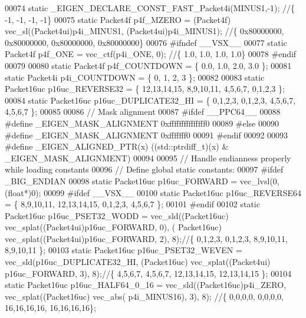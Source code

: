 \begin{DoxyCode}
00074 \textcolor{keyword}{static} \_EIGEN\_DECLARE\_CONST\_FAST\_Packet4i(MINUS1,-1); \textcolor{comment}{//\{ -1, -1, -1, -1\}}
00075 \textcolor{keyword}{static} Packet4f p4f\_MZERO = (Packet4f) vec\_sl((Packet4ui)p4i\_MINUS1, (Packet4ui)p4i\_MINUS1); \textcolor{comment}{//\{
       0x80000000, 0x80000000, 0x80000000, 0x80000000\}}
00076 \textcolor{preprocessor}{#ifndef \_\_VSX\_\_}
00077 \textcolor{keyword}{static} Packet4f p4f\_ONE = vec\_ctf(p4i\_ONE, 0); \textcolor{comment}{//\{ 1.0, 1.0, 1.0, 1.0\}}
00078 \textcolor{preprocessor}{#endif}
00079 
00080 \textcolor{keyword}{static} Packet4f p4f\_COUNTDOWN = \{ 0.0, 1.0, 2.0, 3.0 \};
00081 \textcolor{keyword}{static} Packet4i p4i\_COUNTDOWN = \{ 0, 1, 2, 3 \};
00082 
00083 \textcolor{keyword}{static} Packet16uc p16uc\_REVERSE32 = \{ 12,13,14,15, 8,9,10,11, 4,5,6,7, 0,1,2,3 \};
00084 \textcolor{keyword}{static} Packet16uc p16uc\_DUPLICATE32\_HI = \{ 0,1,2,3, 0,1,2,3, 4,5,6,7, 4,5,6,7 \};
00085 
00086 \textcolor{comment}{// Mask alignment}
00087 \textcolor{preprocessor}{#ifdef \_\_PPC64\_\_}
00088 \textcolor{preprocessor}{#define \_EIGEN\_MASK\_ALIGNMENT   0xfffffffffffffff0}
00089 \textcolor{preprocessor}{#else}
00090 \textcolor{preprocessor}{#define \_EIGEN\_MASK\_ALIGNMENT   0xfffffff0}
00091 \textcolor{preprocessor}{#endif}
00092 
00093 \textcolor{preprocessor}{#define \_EIGEN\_ALIGNED\_PTR(x)   ((std::ptrdiff\_t)(x) & \_EIGEN\_MASK\_ALIGNMENT)}
00094 
00095 \textcolor{comment}{// Handle endianness properly while loading constants}
00096 \textcolor{comment}{// Define global static constants:}
00097 \textcolor{preprocessor}{#ifdef \_BIG\_ENDIAN}
00098 \textcolor{keyword}{static} Packet16uc p16uc\_FORWARD = vec\_lvsl(0, (\textcolor{keywordtype}{float}*)0);
00099 \textcolor{preprocessor}{#ifdef \_\_VSX\_\_}
00100 \textcolor{keyword}{static} Packet16uc p16uc\_REVERSE64 = \{ 8,9,10,11, 12,13,14,15, 0,1,2,3, 4,5,6,7 \};
00101 \textcolor{preprocessor}{#endif}
00102 \textcolor{keyword}{static} Packet16uc p16uc\_PSET32\_WODD   = vec\_sld((Packet16uc) vec\_splat((Packet4ui)p16uc\_FORWARD, 0), (
      Packet16uc) vec\_splat((Packet4ui)p16uc\_FORWARD, 2), 8);\textcolor{comment}{//\{ 0,1,2,3, 0,1,2,3, 8,9,10,11, 8,9,10,11 \};}
00103 \textcolor{keyword}{static} Packet16uc p16uc\_PSET32\_WEVEN  = vec\_sld(p16uc\_DUPLICATE32\_HI, (Packet16uc) vec\_splat((Packet4ui)
      p16uc\_FORWARD, 3), 8);\textcolor{comment}{//\{ 4,5,6,7, 4,5,6,7, 12,13,14,15, 12,13,14,15 \};}
00104 \textcolor{keyword}{static} Packet16uc p16uc\_HALF64\_0\_16 = vec\_sld((Packet16uc)p4i\_ZERO, vec\_splat((Packet16uc) vec\_abs(
      p4i\_MINUS16), 3), 8);      \textcolor{comment}{//\{ 0,0,0,0, 0,0,0,0, 16,16,16,16, 16,16,16,16\};}

\end{DoxyCode}
